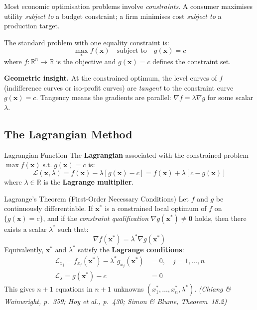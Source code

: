 \documentclass[12pt, a4paper]{article}
\theoremstyle{definition}
\newcommand{\R}{\mathbb{R}}
\newcommand{\bx}{\mathbf{x}}
\newcommand{\bz}{\mathbf{0}}
\newcommand{\st}{\;\text{s.t.}\;}
\begin{document}
Most economic optimisation problems involve \emph{constraints}. A consumer
maximises utility \emph{subject to} a budget constraint; a firm minimises
cost \emph{subject to} a production target.

The standard problem with one equality constraint is:
\[
  \max_{\bx} f(\bx) \quad \text{subject to} \quad g(\bx) = c
\]
where $f: \R^n \to \R$ is the objective and $g(\bx) = c$ defines the
constraint set.

\textbf{Geometric insight.} At the constrained optimum, the level curves of
$f$ (indifference curves or iso-profit curves) are \emph{tangent} to the
constraint curve $g(\bx)=c$. Tangency means the gradients are parallel:
$\nabla f = \lambda \nabla g$ for some scalar $\lambda$.

\subsection{The Lagrangian Method}

\begin{defbox}{Lagrangian Function}
The \textbf{Lagrangian} associated with the constrained problem
$\max f(\bx) \st g(\bx) = c$ is:
\[
  \mathcal{L}(\bx, \lambda)
  = f(\bx) - \lambda[g(\bx) - c]
  = f(\bx) + \lambda[c - g(\bx)]
\]
where $\lambda \in \R$ is the \textbf{Lagrange multiplier}.
\end{defbox}

\begin{thmbox}{Lagrange's Theorem (First-Order Necessary Conditions)}
Let $f$ and $g$ be continuously differentiable. If $\bx^*$ is a constrained
local optimum of $f$ on $\{g(\bx)=c\}$, and if the \emph{constraint
qualification} $\nabla g(\bx^*) \neq \bz$ holds, then there exists a scalar
$\lambda^*$ such that:
\[
  \nabla f(\bx^*) = \lambda^* \nabla g(\bx^*)
\]
Equivalently, $\bx^*$ and $\lambda^*$ satisfy the
\textbf{Lagrange conditions}:
\begin{align}
  \mathcal{L}_{x_j} = f_{x_j}(\bx^*) - \lambda^* g_{x_j}(\bx^*) &= 0,
  \quad j = 1,\ldots,n \label{eq:L_x}\\
  \mathcal{L}_\lambda = g(\bx^*) - c &= 0 \label{eq:L_lam}
\end{align}
This gives $n+1$ equations in $n+1$ unknowns $(x_1^*, \ldots, x_n^*, \lambda^*)$.
\emph{(Chiang \& Wainwright, p.\ 359; Hoy et al., p.\ 430; Simon \& Blume, Theorem~18.2)}
\end{thmbox}
\end{document}
